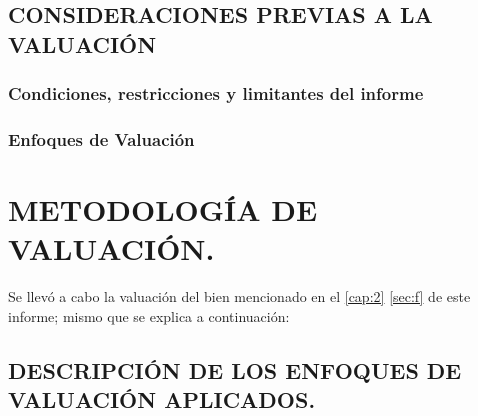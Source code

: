 \documentclass[10pt,letter]{report}
\begin{document}

\newpage




\espacio{1cm}

\section{CONSIDERACIONES PREVIAS A LA VALUACI\'ON}\label{sec:j}

	\subsection{Condiciones, restricciones y limitantes del informe}
	
	
	
	
	\subsection{Enfoques de Valuaci\'on}
	

\espacio{7cm}
	
	
	\begin{center}
 	\printnoidxglossary[type=\acronymtype,title={Acr\'onimos}]
	\printnoidxglossary
	\end{center}
	
	
\chapter{METODOLOG\'IA DE VALUACI\'ON.}\label{cap:4}
\thispagestyle{fancy}

Se llev\'o a cabo la valuaci\'on del bien mencionado en el \autoref{cap:2}  \autoref{sec:f} de este informe; mismo que se explica a continuaci\'on:

\setcounter{section}{10}
\section{DESCRIPCI\'ON DE LOS ENFOQUES DE VALUACI\'ON APLICADOS.}\label{sec:k}
\end{document}
